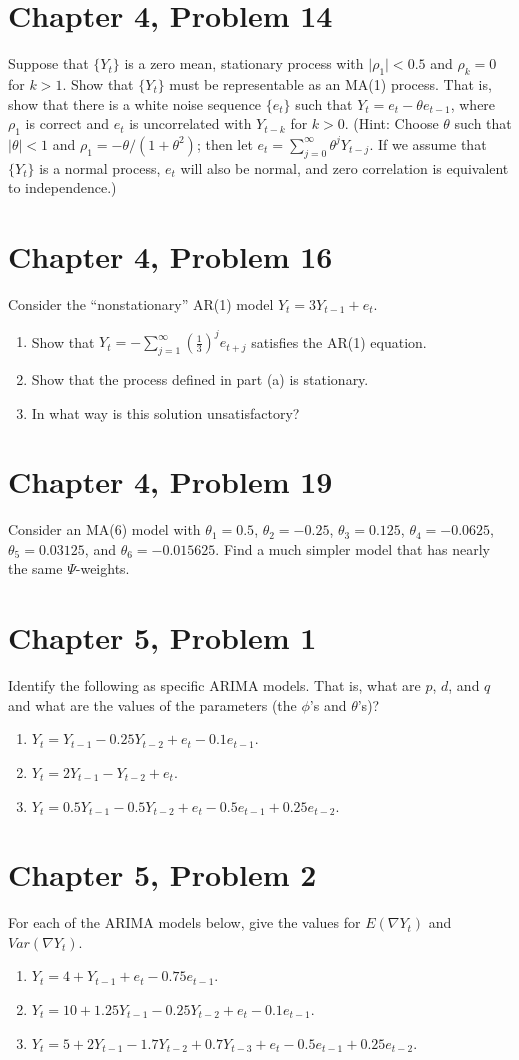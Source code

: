 \documentclass[11pt]{article}
\newif\ifclearpage
\newcommand{\problem}[1]{\section*{#1}}
\newcommand{\solution}{\hrulefill}
\newcommand{\maybeclearpage}{\ifclearpage\clearpage\fi}
\begin{document}
\problem{Chapter 4, Problem 14}
Suppose that $\{Y_t\}$ is a zero mean, stationary process with $\mid \rho_1 \mid < 0.5$ and $\rho_k = 0$ for $k > 1$. Show that $\{Y_t\}$ must be representable as an MA(1) process. That is, show that there is a white noise sequence $\{e_t\}$ such that $Y_t = e_t - \theta e_{t-1}$, where $\rho_1$ is correct and $e_t$ is uncorrelated with $Y_{t-k}$ for $k > 0$. (Hint: Choose $\theta$ such that $\mid \theta \mid < 1$ and $\rho_1 = -\theta/(1+\theta^2)$; then let $e_t = \sum_{j=0}^{\infty} \theta^jY_{t-j}$. If we assume that $\{Y_t\}$ is a normal process, $e_t$ will also be normal, and zero correlation is equivalent to independence.)

\solution


\maybeclearpage
\problem{Chapter 4, Problem 16}
Consider the ``nonstationary'' AR(1) model $Y_t = 3Y_{t-1} + e_t$.
\begin{enumerate}
	\item Show that $Y_t = - \sum_{j=1}^{\infty} \left( \frac{1}{3} \right)^j e_{t+j}$ satisfies the AR(1) equation.
	\item Show that the process defined in part (a) is stationary.
	\item In what way is this solution unsatisfactory?
\end{enumerate}

\solution


\maybeclearpage
\problem{Chapter 4, Problem 19}
Consider an MA(6) model with $\theta_1 = 0.5$, $\theta_2 = -0.25$, $\theta_3 = 0.125$, $\theta_4 = -0.0625$, $\theta_5 = 0.03125$, and $\theta_6 = -0.015625$. Find a much simpler model that has nearly the same $\Psi$-weights.

\solution

\maybeclearpage
\problem{Chapter 5, Problem 1}
Identify the following as specific ARIMA models. That is, what are $p$, $d$, and $q$ and what are the values of the parameters (the $\phi$'s and $\theta$'s)?
\begin{enumerate}
	\item $Y_t = Y_{t-1} - 0.25Y_{t-2} + e_t - 0.1e_{t-1}$.
	\item $Y_t = 2Y_{t-1} - Y_{t-2} + e_t$.
	\item $Y_t = 0.5Y_{t-1} - 0.5Y_{t-2} + e_t - 0.5e_{t-1} + 0.25e_{t-2}$.
\end{enumerate}

\solution


\maybeclearpage
\problem{Chapter 5, Problem 2}
For each of the ARIMA models below, give the values for $E(\nabla Y_t)$ and $Var(\nabla Y_t)$.
\begin{enumerate}
	\item $Y_t = 4 + Y_{t-1} + e_t - 0.75e_{t-1}$.
	\item $Y_t = 10 + 1.25Y_{t-1} - 0.25Y_{t-2} + e_t - 0.1e_{t-1}$.
	\item $Y_t = 5 + 2Y_{t-1} - 1.7Y_{t-2} + 0.7Y_{t-3} + e_t - 0.5e_{t-1} + 0.25e_{t-2}$.
\end{enumerate}
\end{document}
